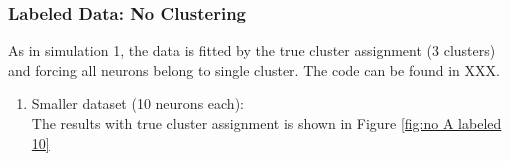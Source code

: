 \documentclass[]{article}
\begin{document}
\subsubsection{Labeled Data: No Clustering}
As in simulation 1, the data is fitted by the true cluster assignment (3 clusters) and forcing all neurons belong to single cluster. The code can be found in XXX.
\begin{enumerate}
	\def\labelenumi{(\arabic{enumi})}
	\item
	Smaller dataset (10 neurons each):\\
	The results with true cluster assignment is shown in Figure \ref{fig:no A labeled 10}
	\begin{figure}[h!]
\end{figure}
\end{enumerate}
\end{document}
